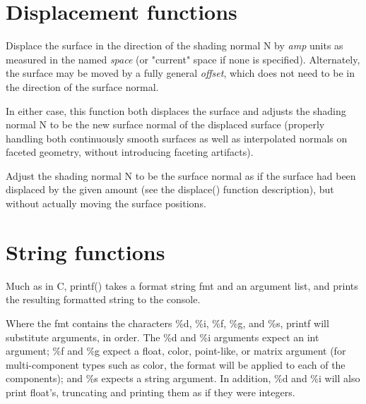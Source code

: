 \documentclass[11pt,letterpaper]{book}
\def\color{{\cf color}\xspace}
\def\float{{\cf float}\xspace}
\def\matrix{{\cf matrix}\xspace}
\def\N{{\cf N}\xspace}
\def\currentspace{{\cf "current"} space\xspace}
\begin{document}
\section{Displacement functions}
\label{sec:stdlib:displace}


Displace the surface in the direction of the shading normal \N by
\emph{amp} units as measured in the named \emph{space} (or \currentspace
if none is specified).  Alternately, the surface may be moved by a fully
general \emph{offset}, which does not need to be in the direction of the
surface normal.

In either case, this function both displaces the surface and adjusts the
shading normal \N to be the new surface normal of the displaced surface
(properly handling both continuously smooth surfaces as well as
interpolated normals on faceted geometry, without introducing faceting
artifacts).
\apiend


Adjust the shading normal \N to be the surface normal as if the
surface had been displaced by the given amount (see the {\cf displace()}
function description), but without actually moving the surface
positions.
\apiend


\section{String functions}
\label{sec:stdlib:string}


Much as in C, {\cf printf()} takes a format string {\cf fmt} and an
argument list, and prints the resulting formatted string to the console.

Where the {\cf fmt} contains the characters {\cf \%d}, {\cf \%i}, {\cf \%f},
{\cf \%g}, and {\cf \%s}, {\cf printf} will substitute arguments, in
order.  The {\cf \%d} and {\cf \%i} arguments expect an {\cf int}
argument; {\cf \%f} and {\cf \%g} expect a \float, \color, point-like,
or \matrix argument (for multi-component types such as \color, the
format will be applied to each of the components); and {\cf \%s} expects
a {\cf string} argument.  In addition, {\cf \%d} and {\cf \%i} will also
print \float's, truncating and printing them as if they were integers.
\end{document}
